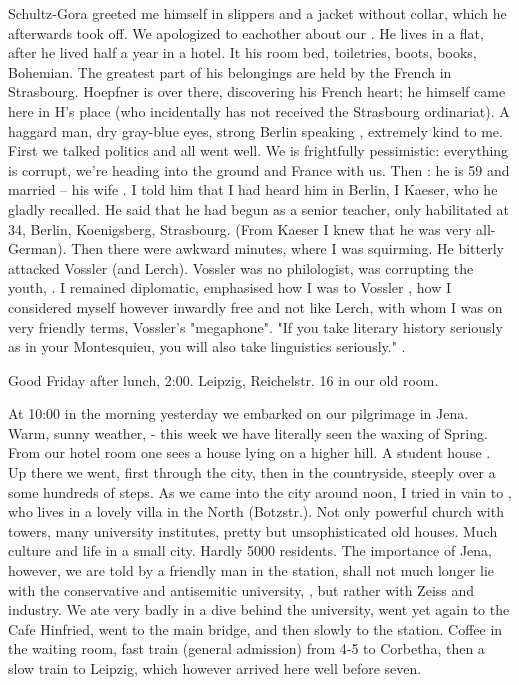 \documentclass{article}
\begin{document}
Schultz-Gora greeted me himself in slippers and a jacket without collar, which he afterwards took off. We apologized to eachother about our . He lives in a  flat, after he lived half a year in a hotel. It his room bed, toiletries, boots, books, Bohemian. The greatest part of his belongings are held by the French in Strasbourg. Hoepfner is over there, discovering his French heart; he himself came here in H's place (who incidentally has not received the Strasbourg ordinariat). A haggard man, dry gray-blue eyes, strong Berlin speaking , extremely kind to me. First we talked politics and all went well. We is frightfully pessimistic: everything is corrupt, we're heading into the ground and France with us. Then : he is 59 and married -- his wife . I told him that I had heard him  in Berlin, I  Kaeser, who he gladly recalled. He said that he had begun as a senior teacher, only habilitated at 34, Berlin, Koenigsberg, Strasbourg. (From Kaeser I knew that he was very all-German). Then there were awkward minutes, where I was squirming. He bitterly attacked Vossler (and Lerch). Vossler was no philologist, was corrupting the youth, . I remained diplomatic, emphasised how  I was to Vossler , how I considered myself however inwardly free and not like Lerch, with whom I was on very friendly terms,  Vossler's "megaphone". "If you take literary history seriously as in your Montesquieu, you will also take linguistics seriously." .

\date{April 2, 1920}
Good Friday after lunch, 2:00.
Leipzig, Reichelstr. 16 in our old room.

At 10:00 in the morning yesterday we embarked on our pilgrimage in Jena. Warm, sunny weather,  - this week we have literally seen the waxing of Spring. From our hotel room one sees a house lying on a higher hill. A student house . Up there we went, first through the city, then in the countryside, steeply over a some hundreds of steps. As we came into the city around noon, I tried in vain to , who lives in a lovely villa in the North (Botzstr.).  Not only powerful church with towers, many university institutes, pretty but unsophisticated old houses. Much culture and life in a small city. Hardly 5000 residents. The importance of Jena, however, we are told by a friendly man in the station, shall not much longer lie with the conservative and antisemitic university, , but rather with Zeiss and industry.
We ate very badly in a dive behind the university, went yet again to the Cafe Hinfried, went to the main bridge, and then slowly to the station. Coffee in the waiting room, fast train (general admission) from 4-5 to Corbetha, then a slow train to Leipzig, which however arrived here well before seven.
\end{document}

